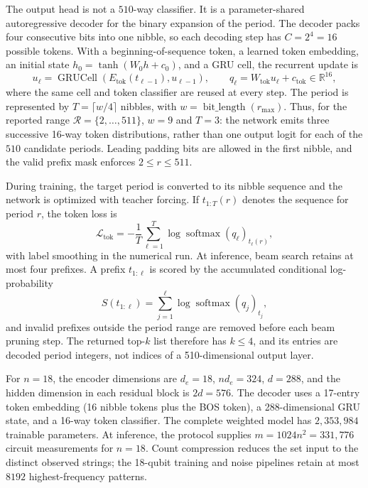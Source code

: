The output head is not a \(510\)-way classifier.  It is a parameter-shared
autoregressive decoder for the binary expansion of the period.  The decoder
packs four consecutive bits into one nibble, so each decoding step has
\(C=2^4=16\) possible tokens.  With a beginning-of-sequence token, a learned
token embedding, an initial state
\(h_0=\tanh(W_0h+c_0)\), and a GRU cell, the recurrent update is
\begin{equation}
    u_\ell=\operatorname{GRUCell}
    \left(E_{\mathrm{tok}}(t_{\ell-1}),u_{\ell-1}\right),
    \qquad
    q_\ell=W_{\mathrm{tok}}u_\ell+c_{\mathrm{tok}}\in\mathbb R^{16},
    \label{eq:decoder_nibble_update}
\end{equation}
where the same cell and token classifier are reused at every step.  The
period is represented by \(T=\lceil w/4\rceil\) nibbles, with
\(w=\operatorname{bit\_length}(r_{\max})\).  Thus, for the reported range
\(\mathcal R=\{2,\ldots,511\}\), \(w=9\) and \(T=3\): the network emits
three successive 16-way token distributions, rather than one output logit for
each of the \(510\) candidate periods.  Leading padding bits are allowed in the
first nibble, and the valid prefix mask enforces \(2\le r\le511\).

During training, the target period is converted to its nibble sequence and the
network is optimized with teacher forcing.  If \(t_{1:T}(r)\) denotes the
sequence for period \(r\), the token loss is
\begin{equation}
    \mathcal L_{\mathrm{tok}}
    =-\frac{1}{T}\sum_{\ell=1}^{T}
      \log\operatorname{softmax}(q_\ell)_{t_\ell(r)},
    \label{eq:decoder_token_loss}
\end{equation}
with label smoothing in the numerical run.  At inference, beam search retains
at most four prefixes.  A prefix \(t_{1:\ell}\) is scored by the accumulated
conditional log-probability
\begin{equation}
    S(t_{1:\ell})
    =\sum_{j=1}^{\ell}
      \log\operatorname{softmax}(q_j)_{t_j},
    \label{eq:decoder_beam_score}
\end{equation}
and invalid prefixes outside the period range are removed before each beam
pruning step.  The returned top-\(k\) list therefore has \(k\le4\), and its
entries are decoded period integers, not indices of a 510-dimensional output
layer.

For \(n=18\), the encoder dimensions are \(d_e=18\), \(nd_e=324\),
\(d=288\), and the hidden dimension in each residual block is \(2d=576\).
The decoder uses a 17-entry token embedding (16 nibble tokens plus the BOS
token), a 288-dimensional GRU state, and a 16-way token classifier.  The
complete weighted model has \(2{,}353{,}984\) trainable parameters.  At
inference, the protocol supplies \(m=1024n^2=331{,}776\) circuit measurements
for \(n=18\).  Count compression reduces the set input to the distinct observed
strings; the 18-qubit training and noise pipelines retain at most \(8192\)
highest-frequency patterns.

